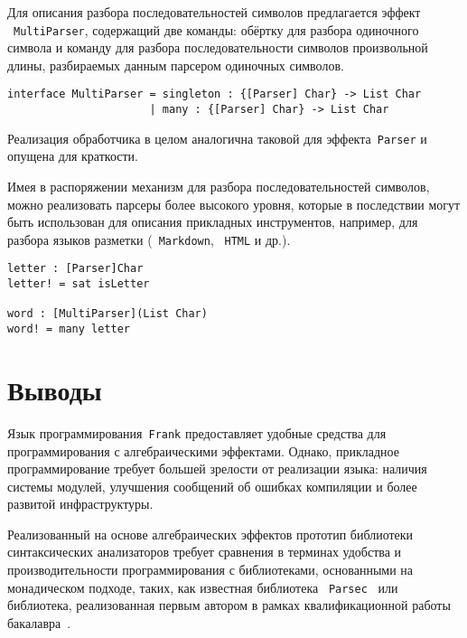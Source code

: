 \documentclass [a4paper] {article}
\begin{document}
Для описания разбора последовательностей символов предлагается эффект
~\texttt{MultiParser}, содержащий две команды: обёртку для разбора одиночного
символа и команду для разбора последовательности символов произвольной длины,
разбираемых данным парсером одиночных символов. 

\begin{verbatim}
interface MultiParser = singleton : {[Parser] Char} -> List Char
                      | many : {[Parser] Char} -> List Char
\end{verbatim}

Реализация обработчика в целом аналогична таковой для эффекта~\texttt{Parser}
и опущена для краткости. 

Имея в распоряжении механизм для разбора последовательностей символов, можно
реализовать парсеры более высокого уровня, которые в последствии могут быть
использован для описания прикладных инструментов, например, для разбора
языков разметки (~\texttt{Markdown}, ~\texttt{HTML} и др.).   

\begin{verbatim}
letter : [Parser]Char
letter! = sat isLetter  

word : [MultiParser](List Char)
word! = many letter
\end{verbatim}

\section{Выводы}

Язык программирования~\texttt{Frank} предоставляет удобные средства для программирования
с алгебраическими эффектами. Однако, прикладное программирование требует большей
зрелости от реализации языка: наличия системы модулей, улучшения сообщений об
ошибках компиляции и более развитой инфраструктуры.

Реализованный на основе алгебраических эффектов прототип библиотеки
~\cite{frankoparsec} синтаксических анализаторов требует сравнения в терминах 
удобства и производительности программирования с библиотеками, 
основанными на монадическом подходе, таких, как известная библиотека
~\texttt{Parsec}~\cite{parsec} или библиотека, реализованная первым автором в
рамках квалификационной работы бакалавра~\cite{mdParse}.

\printbibliography

\end{document}
